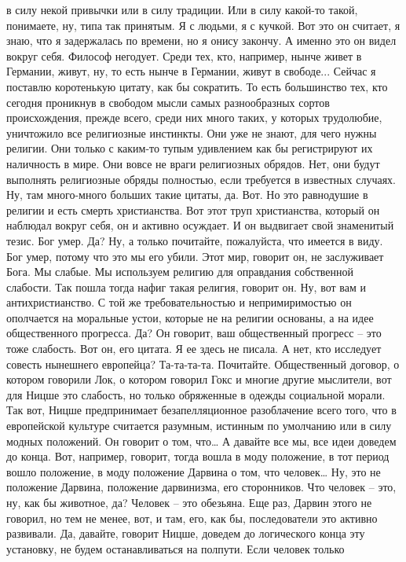 в силу некой привычки или в силу традиции. Или в силу какой-то такой, понимаете,
ну, типа так принятым. Я с людьми, я с кучкой. Вот это он считает, я знаю, что я
задержалась по времени, но я онису закончу. А именно это он видел вокруг себя.
Философ негодует. Среди тех, кто, например, нынче живет в Германии, живут, ну,
то есть нынче в Германии, живут в свободе... Сейчас я поставлю коротенькую
цитату, как бы сократить. То есть большинство тех, кто сегодня проникнув в
свободом мысли самых разнообразных сортов происхождения, прежде всего, среди них
много таких, у которых трудолюбие, уничтожило все религиозные инстинкты. Они уже
не знают, для чего нужны религии. Они только с каким-то тупым удивлением как бы
регистрируют их наличность в мире. Они вовсе не враги религиозных обрядов. Нет,
они будут выполнять религиозные обряды полностью, если требуется в известных
случаях. Ну, там много-много больших такие цитаты, да. Вот. Но это равнодушие в
религии и есть смерть христианства. Вот этот труп христианства, который он
наблюдал вокруг себя, он и активно осуждает. И он выдвигает свой знаменитый
тезис. Бог умер. Да? Ну, а только почитайте, пожалуйста, что имеется в виду. Бог
умер, потому что это мы его убили. Этот мир, говорит он, не заслуживает Бога. Мы
слабые. Мы используем религию для оправдания собственной слабости. Так пошла
тогда нафиг такая религия, говорит он. Ну, вот вам и антихристианство. С той же
требовательностью и непримиримостью он ополчается на моральные устои, которые не
на религии основаны, а на идее общественного прогресса. Да? Он говорит, ваш
общественный прогресс – это тоже слабость. Вот он, его цитата. Я ее здесь не
писала. А нет, кто исследует совесть нынешнего европейца? Та-та-та-та.
Почитайте. Общественный договор, о котором говорили Лок, о котором говорил Гокс
и многие другие мыслители, вот для Ницше это слабость, но только обряженные в
одежды социальной морали. Так вот, Ницше предпринимает безапелляционное
разоблачение всего того, что в европейской культуре считается разумным, истинным
по умолчанию или в силу модных положений. Он говорит о том, что… А давайте все
мы, все идеи доведем до конца. Вот, например, говорит, тогда вошла в моду
положение, в тот период вошло положение, в моду положение Дарвина о том, что
человек… Ну, это не положение Дарвина, положение дарвинизма, его сторонников.
Что человек – это, ну, как бы животное, да? Человек – это обезьяна. Еще раз,
Дарвин этого не говорил, но тем не менее, вот, и там, его, как бы, последователи
это активно развивали. Да, давайте, говорит Ницше, доведем до логического конца
эту установку, не будем останавливаться на полпути. Если человек только
